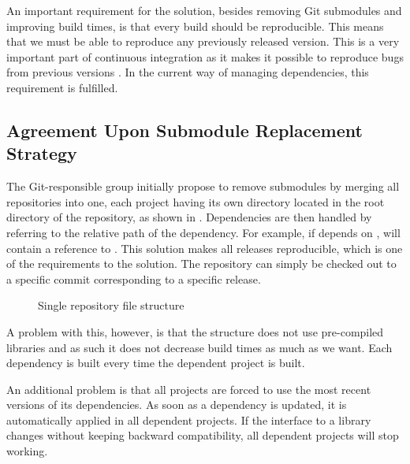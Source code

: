 An important requirement for the solution, besides removing Git submodules and improving build times, is that every build should be reproducible. This means that we must be able to reproduce any previously released version. This is a very important part of continuous integration as it makes it possible to reproduce bugs from previous versions \parencite{fowlerReproducibleBuild,humble2010}. In the current way of managing dependencies, this requirement is fulfilled.

\subsection{Agreement Upon Submodule Replacement Strategy}
The Git-responsible group initially propose to remove submodules by merging all repositories into one, each project having its own directory located in the root directory of the repository, as shown in . Dependencies are then handled by referring to the relative path of the dependency. For example, if  depends on ,  will contain a reference to . This solution makes all releases reproducible, which is one of the requirements to the solution. The repository can simply be checked out to a specific commit corresponding to a specific release.
\begin{figure}
\caption{Single repository file structure} \label{fig:single_repo_structure}
\end{figure}
A problem with this, however, is that the structure does not use pre-compiled libraries and as such it does not decrease build times as much as we want. Each dependency is built every time the dependent project is built.

An additional problem is that all projects are forced to use the most recent versions of its dependencies. As soon as a dependency is updated, it is automatically applied in all dependent projects. If the interface to a library changes without keeping backward compatibility, all dependent projects will stop working.

